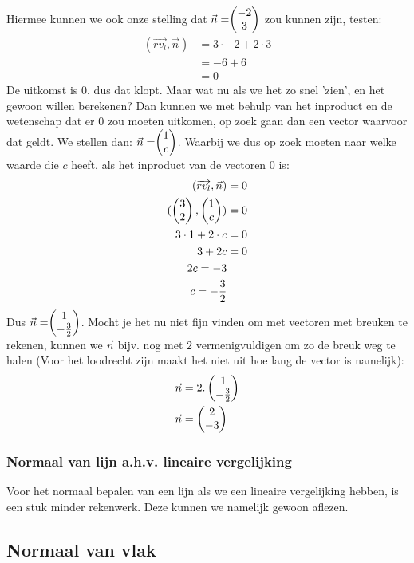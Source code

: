 Hiermee kunnen we ook onze stelling dat $ \vec{n} = \vectwee{-2}{3} $ zou kunnen zijn, testen: 
\begin{align*}
  (\overrightarrow{rv_{l} }, \vec{n}) &= 3\cdot-2 + 2\cdot3 \\
  &= -6 + 6 \\
  &= 0
\end{align*}
De uitkomst is $0$, dus dat klopt. Maar wat nu als we het zo snel 'zien', en het gewoon willen berekenen? Dan kunnen we met behulp van het inproduct en de wetenschap dat er $0$ zou moeten uitkomen, op zoek gaan dan een vector waarvoor dat geldt. We stellen dan: $\vec{n} = \vectwee {1} {c} $. Waarbij we dus op zoek moeten naar welke waarde die $c$ heeft, als het inproduct van de vectoren $0$ is:
\begin{align*}
  (\overrightarrow{rv_{l} }, \vec{n}) &= 0  \\
  (\begin{pmatrix} 3 \\ 2 \end{pmatrix}, \begin{pmatrix} 1 \\ c \end{pmatrix}) &= 0 \\
  3\cdot1 + 2\cdot c &= 0\\
  3 + 2c &= 0 \\
  2c = -3 \\
  c = -\frac{3}{2}
\end{align*}
Dus $\vec{n} = \vectwee{1}{-\frac{3}{2}} $. Mocht je het nu niet fijn vinden om met vectoren met breuken te rekenen, kunnen we $\vec{n}$ bijv. nog met $2$ vermenigvuldigen om zo de breuk weg te halen (Voor het loodrecht zijn maakt het niet uit hoe lang de vector is namelijk):
\begin{align*}
  \vec{n} &= 2.\begin{pmatrix} 1 \\ -\frac{3}{2} \end{pmatrix} \\ 
  \vec{n} &= \begin{pmatrix} 2 \\ -3 \end{pmatrix} 
\end{align*}

\subsubsection{Normaal van lijn a.h.v. lineaire vergelijking}
Voor het normaal bepalen van een lijn als we een lineaire vergelijking hebben, is een stuk minder rekenwerk. Deze kunnen we namelijk gewoon aflezen.


\subsection{Normaal van vlak}

